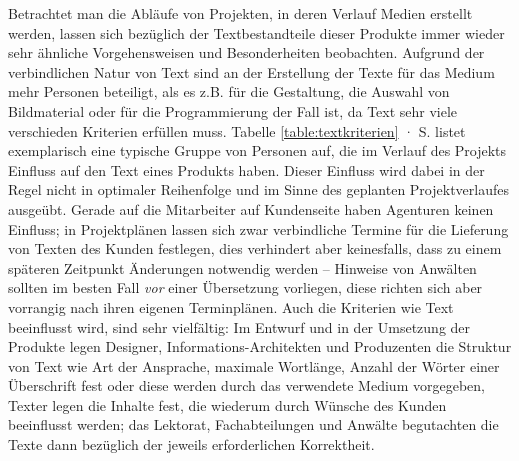 Betrachtet man die Abläufe von Projekten, in deren Verlauf Medien erstellt werden, lassen sich bezüglich der Textbestandteile dieser Produkte immer wieder sehr ähnliche Vorgehensweisen und Besonderheiten beobachten. Aufgrund der verbindlichen Natur von Text sind an der Erstellung der Texte für das Medium mehr Personen beteiligt, als es z.B. für die Gestaltung, die Auswahl von Bildmaterial oder für die Programmierung der Fall ist, da Text sehr viele verschieden Kriterien erfüllen muss. Tabelle \ref{table:textkriterien} · S.\pageref{table:textkriterien} listet exemplarisch eine typische Gruppe von Personen auf, die im Verlauf des Projekts Einfluss auf den Text eines Produkts haben. Dieser Einfluss wird dabei in der Regel nicht in optimaler Reihenfolge und im Sinne des geplanten Projektverlaufes ausgeübt. Gerade auf die Mitarbeiter auf Kundenseite haben Agenturen keinen Einfluss; in Projektplänen lassen sich zwar verbindliche Termine für die Lieferung von Texten des Kunden festlegen, dies verhindert aber keinesfalls, dass zu einem späteren Zeitpunkt Änderungen notwendig werden -- Hinweise von Anwälten sollten im besten Fall \emph{vor} einer Übersetzung vorliegen, diese richten sich aber vorrangig nach ihren eigenen Terminplänen. Auch die Kriterien wie Text beeinflusst wird, sind sehr vielfältig: Im Entwurf und in der Umsetzung der Produkte legen Designer, Informations-Architekten und Produzenten die Struktur von Text wie Art der Ansprache, maximale Wortlänge, Anzahl der Wörter einer Überschrift fest oder diese werden durch das verwendete Medium vorgegeben, Texter legen die Inhalte fest, die wiederum durch Wünsche des Kunden beeinflusst werden; das Lektorat, Fachabteilungen und Anwälte begutachten die Texte dann bezüglich der jeweils erforderlichen Korrektheit.

